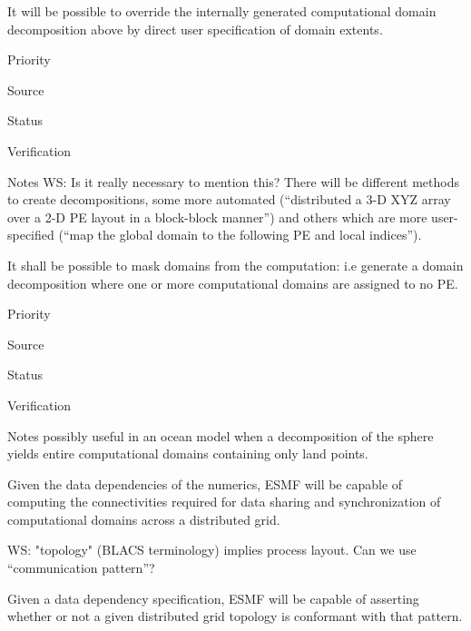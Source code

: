 
It will be possible to override the internally generated computational
domain decomposition above by direct user specification of domain
extents.

\begin{reqlist}
\item[Priority]
\item[Source]
\item[Status]
\item[Verification]
\item[Notes]  WS: Is it really necessary to mention this? There will
be different methods to create decompositions, some more automated
(``distributed a 3-D XYZ array over a 2-D PE layout in a block-block
manner'') and others which are more user-specified (``map the global domain
to the following PE and local indices'').

\end{reqlist}


It shall be possible to mask domains from the computation: i.e
generate a domain decomposition where one or more computational
domains are assigned to no PE.

\begin{reqlist}
\item[Priority]
\item[Source]
\item[Status]
\item[Verification]
\item[Notes] possibly useful in an ocean model when a decomposition
  of the sphere yields entire computational domains containing only
  land points.
\end{reqlist}


Given the data dependencies of the numerics, ESMF will be capable of
computing the connectivities required for data sharing and
synchronization of computational domains across a distributed grid.

WS:  "topology" (BLACS terminology) implies process layout.
Can we use ``communication pattern''?


Given a data dependency specification, ESMF will be capable of
asserting whether or not a given distributed grid topology is
conformant with that pattern.

